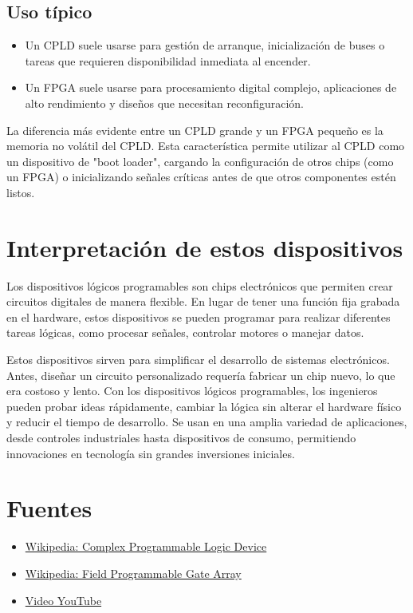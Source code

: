 \documentclass{article}
\theoremstyle{mytheoremstyle}
\theoremstyle{mytheoremstyle}
\theoremstyle{myproblemstyle}
\begin{document}
\subsection*{Uso típico}
\begin{itemize}
    \item Un CPLD suele usarse para gestión de arranque, inicialización de buses o tareas que requieren disponibilidad inmediata al encender.
    \item Un FPGA suele usarse para procesamiento digital complejo, aplicaciones de alto rendimiento y diseños que necesitan reconfiguración.
\end{itemize}

La diferencia más evidente entre un CPLD grande y un FPGA pequeño es la memoria no volátil del CPLD.  
Esta característica permite utilizar al CPLD como un dispositivo de "boot loader", cargando la
configuración de otros chips (como un FPGA) o inicializando señales críticas antes de que otros
componentes estén listos.

\section{Interpretación de estos dispositivos}
Los dispositivos lógicos programables son chips electrónicos que permiten crear circuitos
digitales de manera flexible. En lugar de tener una función fija grabada en el hardware, estos
dispositivos se pueden programar para realizar diferentes tareas lógicas, como procesar señales,
controlar motores o manejar datos.

Estos dispositivos sirven para simplificar el desarrollo de sistemas electrónicos. Antes, diseñar
un circuito personalizado requería fabricar un chip nuevo, lo que era costoso y lento. Con los
dispositivos lógicos programables, los ingenieros pueden probar ideas rápidamente, cambiar la
lógica sin alterar el hardware físico y reducir el tiempo de desarrollo. Se usan en una amplia
variedad de aplicaciones, desde controles industriales hasta dispositivos de consumo, permitiendo
innovaciones en tecnología sin grandes inversiones iniciales.

\section{Fuentes}
\begin{itemize}
    \item \href{https://en.wikipedia.org/wiki/Complex_programmable_logic_device}{Wikipedia: Complex Programmable Logic Device}
    \item \href{https://en.wikipedia.org/wiki/Field-programmable_gate_array}{Wikipedia: Field Programmable Gate Array}
    \item \href{https://www.youtube.com/watch?v=trBiZkW6POk}{Video YouTube}
\end{itemize}
\end{document}
